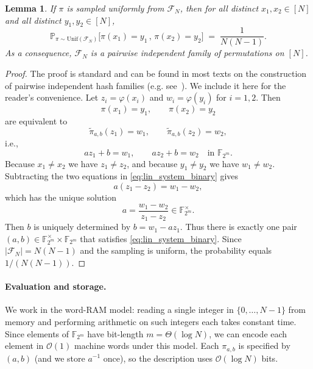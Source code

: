 \documentclass[journal]{IEEEtran}
\newtheorem{lemma}{Lemma}
\theoremstyle{definition}
\theoremstyle{definition}
\newcommand{\PP}{\mathbb{P}}
\newcommand{\bigO}{\mathcal{O}}
\begin{document}
\begin{lemma}\label{lem:affine_pairwise_binary}
If \(\pi\) is sampled uniformly from \(\mathcal{F}_N\), then for all distinct \(x_1,x_2\in [N]\) and all distinct \(y_1,y_2\in [N]\),
\[
\PP_{\pi\sim \mathrm{Unif}(\mathcal{F}_N)} \bigl[\pi(x_1)=y_1 \, , \, \pi(x_2)=y_2\bigr]
\;=\; \frac{1}{N(N-1)}.
\]
As a consequence, \(\mathcal{F}_N\) is a pairwise independent family of permutations on \([N]\).
\end{lemma}
\begin{proof}
The proof is standard and can be found in most texts on the construction of pairwise independent hash families (e.g. see~\cite{luby2006pairwise}). We include it here for the reader’s convenience. Let \(z_i=\varphi(x_i)\) and \(w_i=\varphi(y_i)\) for \(i=1,2\). Then
\[
\pi(x_1)=y_1,\qquad \pi(x_2)=y_2
\]
are equivalent to
\[
\widetilde{\pi}_{a,b}(z_1)=w_1,\qquad \widetilde{\pi}_{a,b}(z_2)=w_2,
\]
i.e.,
\begin{equation}\label{eq:lin_system_binary}
a z_1 + b = w_1,\qquad a z_2 + b = w_2 \quad \text{in } \mathbb{F}_{2^{m}}.
\end{equation}
Because \(x_1\ne x_2\) we have \(z_1\ne z_2\), and because \(y_1\ne y_2\) we have \(w_1\ne w_2\).
Subtracting the two equations in \eqref{eq:lin_system_binary} gives
\[
a(z_1 - z_2) = w_1 - w_2,
\]
which has the unique solution
\[
a = \frac{w_1 - w_2}{\,z_1 - z_2\,} \in \mathbb{F}_{2^{m}}^{\times}.
\]
Then \(b\) is uniquely determined by \(b = w_1 - a z_1\). Thus there is exactly one pair
\((a,b)\in \mathbb{F}_{2^{m}}^{\times}\times \mathbb{F}_{2^{m}}\) that satisfies \eqref{eq:lin_system_binary}. Since \(|\mathcal{F}_N|=N(N-1)\) and the sampling is uniform, the probability equals \(1/(N(N-1))\).

\end{proof}

\paragraph{Evaluation and storage.}
We work in the word\mbox{-}RAM model: reading a single integer in \(\{0,\dots,N-1\}\) from memory and performing arithmetic on such integers each takes constant time.
Since elements of \(\mathbb{F}_{2^m}\) have bit\mbox{-}length \(m=\Theta(\log N)\), we can encode each element in \(\bigO(1)\) machine words under this model.
Each \(\pi_{a,b}\) is specified by \((a,b)\) (and we store \(a^{-1}\) once), so the description uses \(\bigO(\log N)\) bits.
\end{document}
